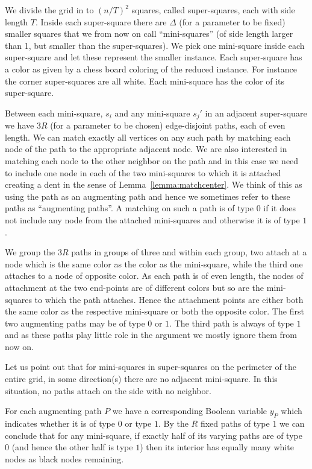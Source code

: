 \documentclass{article}\usepackage[a4paper,margin=20mm]{geometry}
\begin{document}
We divide the grid in to  $(n/T)^2$ squares, called super-squares,
each with side length $T$.  Inside each super-square 
there are $\Delta$ (for a parameter to be fixed) smaller squares that we from
now on call ``mini-squares'' (of side length larger than 1, but
smaller than the super-squares).  We pick one
mini-square inside each super-square and let these represent
the smaller instance.  Each super-square has a color as given
by a chess board coloring of the reduced instance.  For instance
the corner super-squares are all white.  Each mini-square has
the color of its super-square.

Between each mini-square, $s_i$ and any mini-square
$s_j'$ in an adjacent super-square we have $3R$ (for a parameter to
be chosen) edge-disjoint paths,
each of even length.  We can match exactly all vertices on any such
path by matching each node of the path to the appropriate adjacent
node.  We are also interested in matching each node to the other neighbor
on the path and in this case we need to include 
one node in each of the two mini-squares
to which it is attached creating a dent in the
sense of Lemma~\ref{lemma:matchcenter}.
We think of this as using
the path as an augmenting path and hence we sometimes refer to these
paths as ``augmenting paths''.  A matching on such a path is of
type $0$ if it does not include any node from the attached
mini-squares and otherwise it is of type $1$. 

We group
the $3R$ paths in groups of three and within each
group, two attach at a node which is the same color as
the color as the mini-square, while the third one
attaches to a node of opposite color.  
As each path is of even length, the nodes of
attachment at the two end-points are of different colors but so are the
mini-squares to which the path attaches.  Hence
the  attachment points are either both the same color as
the respective mini-square or both the opposite color.
The first two augmenting paths
may be of type $0$ or $1$.  The third path is always of
type $1$ and as these paths play little role in the argument
we mostly ignore them from now on.

Let us point out that for mini-squares in super-squares on the perimeter of the
entire grid, in some direction(s) there are no adjacent 
mini-square.  In this situation, no paths attach on the
side with no neighbor.

For each augmenting path $P$ we have a corresponding Boolean
variable $y_P$ which indicates whether it is of type $0$
or type $1$.  By the $R$ fixed paths of type $1$
we can conclude that for any mini-square, if
exactly half of its varying  paths are of type $0$ (and
hence the other half is type $1$) then its interior
has equally many white nodes as black
nodes remaining.  
\end{document}
